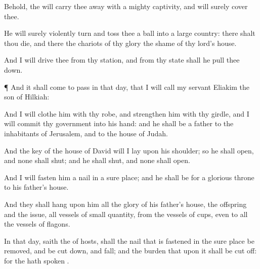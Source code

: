 {Behold, the
{} will carry thee
away with a
mighty
captivity, and will
surely
cover thee.

He will
surely violently
turn and
toss thee
{} a
ball into a
large
country: there shalt thou
die, and there the
chariots of thy
glory
{} the
shame of thy
lord’s
house.

And I will
drive thee from thy
station, and from thy
state shall he pull thee
down.


\par }{\PP {}¶ And it shall come to pass in that
day, that I will
call my
servant
Eliakim the
son of
Hilkiah:

And I will
clothe him with thy
robe, and
strengthen him with thy
girdle, and I will
commit thy
government into his
hand: and he shall be a
father to the
inhabitants of
Jerusalem, and to the
house of
Judah.

And the
key of the
house of
David will I
lay upon his
shoulder; so he shall
open, and none shall
shut; and he shall
shut, and none shall
open.

And I will
fasten him
{} a
nail in a
sure
place; and he shall be for a
glorious
throne to his
father’s
house.

And they shall
hang upon him all the
glory of his
father’s
house, the
offspring and the
issue, all
vessels of
small quantity, from the
vessels of
cups, even to all the
vessels of
flagons.

In that
day,
saith the
{} of
hosts, shall the
nail that is
fastened in the
sure
place be
removed, and be cut
down, and
fall; and the
burden that
{} upon it shall be cut
off: for the
{} hath
spoken
{}.




\par }
